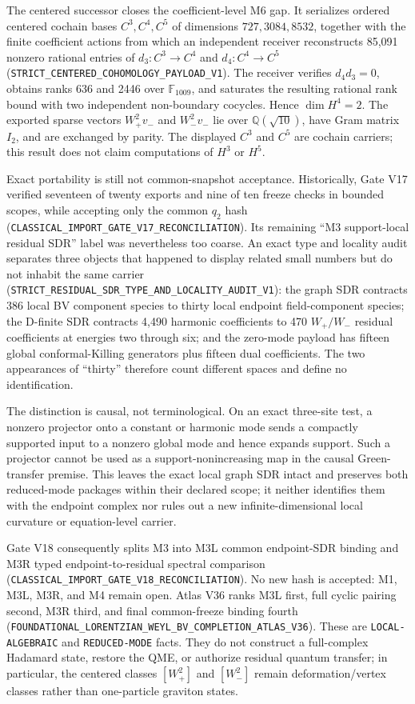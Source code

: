 \documentclass[11pt]{article}
\theoremstyle{definition}
\theoremstyle{remark}
\newcommand{\cert}[1]{\nolinkurl{#1}}
\newcommand{\rtype}[1]{\nolinkurl{#1}}
\begin{document}
The centered successor closes the coefficient-level M6 gap.  It serializes
ordered centered cochain bases \(C^3,C^4,C^5\) of dimensions
\(727,3084,8532\), together with the finite coefficient actions from which an
independent receiver reconstructs 85,091 nonzero rational entries of
\(d_3:C^3\to C^4\) and \(d_4:C^4\to C^5\)
(\cert{STRICT_CENTERED_COHOMOLOGY_PAYLOAD_V1}).  The receiver verifies
\(d_4d_3=0\), obtains ranks 636 and 2446 over \(\mathbb F_{1009}\), and
saturates the resulting rational rank bound with two independent non-boundary
cocycles.  Hence \(\dim H^4=2\).  The exported sparse vectors
\(W_+^2v_-\) and \(W_-^2v_-\) lie over \(\mathbb Q(\sqrt{10})\), have Gram
matrix \(I_2\), and are exchanged by parity.  The displayed \(C^3\) and
\(C^5\) are cochain carriers; this result does not claim computations of
\(H^3\) or \(H^5\).

Exact portability is still not common-snapshot acceptance.  Historically,
Gate V17 verified seventeen of twenty exports and nine of ten freeze checks in
bounded scopes, while accepting only the common \(q_2\) hash
(\cert{CLASSICAL_IMPORT_GATE_V17_RECONCILIATION}).  Its remaining ``M3
support-local residual SDR'' label was nevertheless too coarse.  An exact type
and locality audit separates three objects that happened to display related
small numbers but do not inhabit the same carrier
(\cert{STRICT_RESIDUAL_SDR_TYPE_AND_LOCALITY_AUDIT_V1}):
the graph SDR contracts 386 local BV component species to thirty local endpoint
field-component species; the D-finite SDR contracts 4,490 harmonic coefficients
to 470 \(W_+/W_-\) residual coefficients at energies two through six; and the
zero-mode payload has fifteen global conformal-Killing generators plus fifteen
dual coefficients.  The two appearances of ``thirty'' therefore count
different spaces and define no identification.

The distinction is causal, not terminological.  On an exact three-site test, a
nonzero projector onto a constant or harmonic mode sends a compactly supported
input to a nonzero global mode and hence expands support.  Such a projector
cannot be used as a support-nonincreasing map in the causal Green-transfer
premise.  This leaves the exact local graph SDR intact and preserves both
reduced-mode packages within their declared scope; it neither identifies them
with the endpoint complex nor rules out a new infinite-dimensional local
curvature or equation-level carrier.

Gate V18 consequently splits M3 into M3L common endpoint-SDR binding and M3R
typed endpoint-to-residual spectral comparison
(\cert{CLASSICAL_IMPORT_GATE_V18_RECONCILIATION}).  No new hash is accepted:
M1, M3L, M3R, and M4 remain open.  Atlas V36 ranks M3L first, full cyclic
pairing second, M3R third, and final common-freeze binding fourth
(\cert{FOUNDATIONAL_LORENTZIAN_WEYL_BV_COMPLETION_ATLAS_V36}).  These are
\rtype{LOCAL-ALGEBRAIC} and \rtype{REDUCED-MODE} facts.  They do not construct a
full-complex Hadamard state, restore the QME, or authorize residual quantum
transfer; in particular, the centered classes \( [W_+^2] \) and
\( [W_-^2] \) remain deformation/vertex classes rather than one-particle
graviton states.
\end{document}
